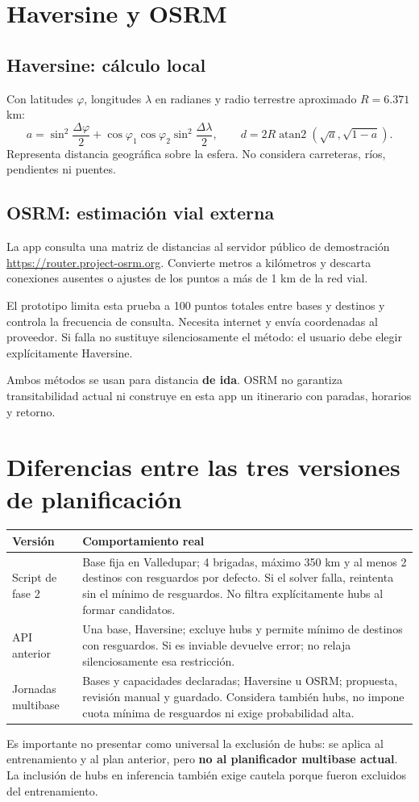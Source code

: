 \documentclass[11pt,a4paper]{report}
\newcommand{\campo}[1]{\texttt{\detokenize{#1}}}
\begin{document}
\section{Haversine y OSRM}
\subsection{Haversine: cálculo local}
Con latitudes $\varphi$, longitudes $\lambda$ en radianes y radio terrestre aproximado $R=6.371$ km:
\[
a=\sin^2\frac{\Delta\varphi}{2}
+\cos\varphi_1\cos\varphi_2\sin^2\frac{\Delta\lambda}{2},
\qquad
d=2R\operatorname{atan2}(\sqrt a,\sqrt{1-a}).
\]
Representa distancia geográfica sobre la esfera. No considera carreteras, ríos, pendientes ni puentes.

\subsection{OSRM: estimación vial externa}
La app consulta una matriz de distancias al servidor público de demostración \url{https://router.project-osrm.org}. Convierte metros a kilómetros y descarta conexiones ausentes o ajustes de los puntos a más de 1 km de la red vial.

El prototipo limita esta prueba a 100 puntos totales entre bases y destinos y controla la frecuencia de consulta. Necesita internet y envía coordenadas al proveedor. Si falla no sustituye silenciosamente el método: el usuario debe elegir explícitamente Haversine.

Ambos métodos se usan para distancia \textbf{de ida}. OSRM no garantiza transitabilidad actual ni construye en esta app un itinerario con paradas, horarios y retorno.

\section{Diferencias entre las tres versiones de planificación}
\begin{longtable}{@{}p{}p{}@{}}
\toprule
\textbf{Versión} & \textbf{Comportamiento real}\\
\midrule
\endhead
Script de fase 2 & Base fija en Valledupar; 4 brigadas, máximo 350 km y al menos 2 destinos con resguardos por defecto. Si el solver falla, reintenta sin el mínimo de resguardos. No filtra explícitamente hubs al formar candidatos.\\
API anterior \campo{/plans} & Una base, Haversine; excluye hubs y permite mínimo de destinos con resguardos. Si es inviable devuelve error; no relaja silenciosamente esa restricción.\\
Jornadas multibase & Bases y capacidades declaradas; Haversine u OSRM; propuesta, revisión manual y guardado. Considera también hubs, no impone cuota mínima de resguardos ni exige probabilidad alta.\\
\bottomrule
\end{longtable}
Es importante no presentar como universal la exclusión de hubs: se aplica al entrenamiento y al plan anterior, pero \textbf{no al planificador multibase actual}. La inclusión de hubs en inferencia también exige cautela porque fueron excluidos del entrenamiento.
\end{document}
